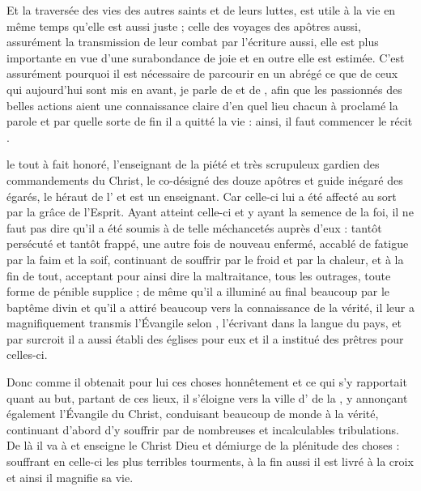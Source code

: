 

Et la traversée des vies des autres saints et de leurs luttes, est utile à la vie en même temps qu'elle est aussi juste ;
celle des voyages des apôtres aussi, assurément la transmission de leur combat par l'écriture aussi,  
elle est plus importante en vue d'une surabondance de joie et en outre elle est estimée.
C'est assurément pourquoi il est nécessaire de parcourir en un abrégé ce que  de ceux qui aujourd'hui sont mis en avant, je parle de  et de , 
afin que les passionnés des belles actions aient une connaissance claire d'en quel lieu chacun à proclamé la parole et par quelle sorte de fin il a quitté la vie : ainsi, il faut commencer le récit .

 le tout à fait honoré, l'enseignant de la piété et  très scrupuleux gardien des commandements du Christ, 
le co-désigné des douze apôtres et guide inégaré  des égarés,
le héraut de l'  et est un enseignant.
Car celle-ci lui a été affecté au sort par la grâce de l'Esprit.
Ayant atteint celle-ci et y ayant  la semence de la foi,
il ne faut pas dire qu'il a été soumis à de telle méchancetés auprès d'eux :
tantôt persécuté et tantôt frappé, 
une autre fois de nouveau  enfermé,
accablé de fatigue par la faim et la soif, 
continuant de souffrir par le froid et par la chaleur,
et à la fin de tout,
acceptant pour ainsi dire la maltraitance,
tous les outrages, 
toute forme de pénible supplice ;
de même qu'il a illuminé au final beaucoup par le baptême divin et qu'il a attiré beaucoup vers la connaissance de la vérité, %
il leur a magnifiquement transmis l'Évangile selon ,
l'écrivant dans la langue du pays, 
et  par surcroit il a aussi établi des églises pour eux
et il a institué des prêtres pour celles-ci.

Donc comme il obtenait  pour lui ces choses honnêtement et ce qui s'y rapportait quant au but, 
partant de ces lieux, il s'éloigne vers la ville d' de la  
, y annonçant également l'Évangile du Christ,
conduisant beaucoup de monde à la vérité,
continuant d'abord d'y souffrir par de nombreuses et incalculables tribulations.
De là il va à  et enseigne le Christ Dieu et démiurge de la plénitude des choses :
souffrant en celle-ci les plus terribles tourments,
à la fin aussi il est livré à la croix et ainsi il magnifie sa vie.

